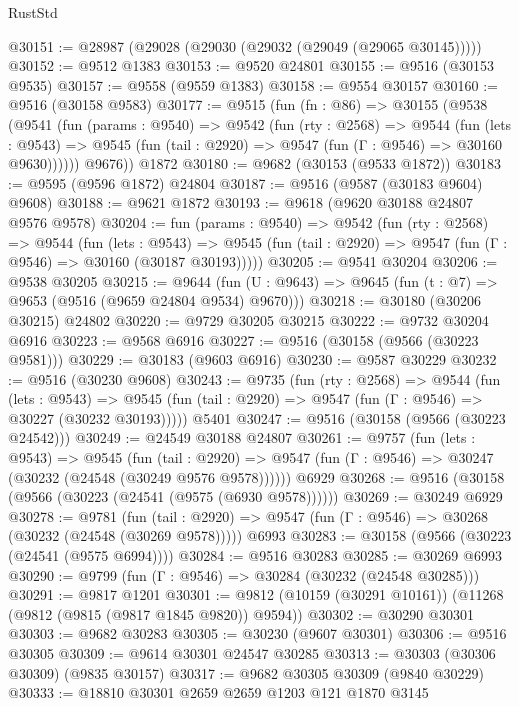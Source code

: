 \begin{lexlean}{RustStd}
\begin{coremodule}
@30151 := @28987 (@29028 (@29030 (@29032 (@29049 (@29065 @30145)))))
@30152 := @9512 @1383
@30153 := @9520 @24801
@30155 := @9516 (@30153 @9535)
@30157 := @9558 (@9559 @1383)
@30158 := @9554 @30157
@30160 := @9516 (@30158 @9583)
@30177 := @9515
    (fun (fn : @86) =>
    @30155
      (@9538
        (@9541
          (fun (params : @9540) =>
          @9542
            (fun (rty : @2568) =>
            @9544
              (fun (lets : @9543) =>
              @9545 (fun (tail : @2920) => @9547 (fun (Γ : @9546) => @30160 @9630))))))
        @9676))
    @1872
@30180 := @9682 (@30153 (@9533 @1872))
@30183 := @9595 (@9596 @1872) @24804
@30187 := @9516 (@9587 (@30183 @9604) @9608)
@30188 := @9621 @1872
@30193 := @9618 (@9620 @30188 @24807 @9576 @9578)
@30204 := fun (params : @9540) =>
  @9542
    (fun (rty : @2568) =>
    @9544
      (fun (lets : @9543) =>
      @9545 (fun (tail : @2920) => @9547 (fun (Γ : @9546) => @30160 (@30187 @30193)))))
@30205 := @9541 @30204
@30206 := @9538 @30205
@30215 := @9644
    (fun (U : @9643) => @9645 (fun (t : @7) => @9653 (@9516 (@9659 @24804 @9534) @9670)))
@30218 := @30180 (@30206 @30215) @24802
@30220 := @9729 @30205 @30215
@30222 := @9732 @30204 @6916
@30223 := @9568 @6916
@30227 := @9516 (@30158 (@9566 (@30223 @9581)))
@30229 := @30183 (@9603 @6916)
@30230 := @9587 @30229
@30232 := @9516 (@30230 @9608)
@30243 := @9735
    (fun (rty : @2568) =>
    @9544
      (fun (lets : @9543) =>
      @9545 (fun (tail : @2920) => @9547 (fun (Γ : @9546) => @30227 (@30232 @30193)))))
    @5401
@30247 := @9516 (@30158 (@9566 (@30223 @24542)))
@30249 := @24549 @30188 @24807
@30261 := @9757
    (fun (lets : @9543) =>
    @9545
      (fun (tail : @2920) =>
      @9547 (fun (Γ : @9546) => @30247 (@30232 (@24548 (@30249 @9576 @9578))))))
    @6929
@30268 := @9516 (@30158 (@9566 (@30223 (@24541 (@9575 (@6930 @9578))))))
@30269 := @30249 @6929
@30278 := @9781
    (fun (tail : @2920) => @9547 (fun (Γ : @9546) => @30268 (@30232 (@24548 (@30269 @9578)))))
    @6993
@30283 := @30158 (@9566 (@30223 (@24541 (@9575 @6994))))
@30284 := @9516 @30283
@30285 := @30269 @6993
@30290 := @9799 (fun (Γ : @9546) => @30284 (@30232 (@24548 @30285)))
@30291 := @9817 @1201
@30301 := @9812 (@10159 (@30291 @10161)) (@11268 (@9812 (@9815 (@9817 @1845 @9820)) @9594))
@30302 := @30290 @30301
@30303 := @9682 @30283
@30305 := @30230 (@9607 @30301)
@30306 := @9516 @30305
@30309 := @9614 @30301 @24547 @30285
@30313 := @30303 (@30306 @30309) (@9835 @30157)
@30317 := @9682 @30305 @30309 (@9840 @30229)
@30333 := @18810
    @30301
    @2659
    @2659
    @1203
    @121
    @1870
    @3145

\end{coremodule}
\end{lexlean}
